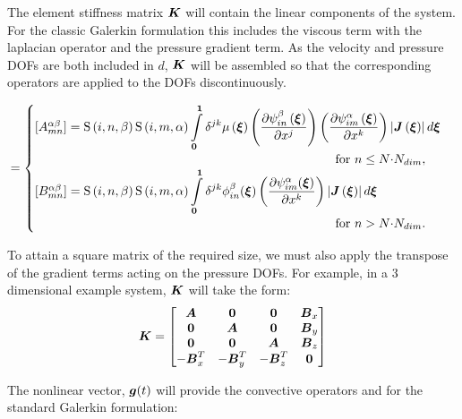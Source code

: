 The element stiffness matrix $\matr{K}$ will contain the linear components of
the system. For the classic Galerkin formulation this includes the viscous
term with the laplacian operator and the pressure gradient term. As the
velocity and pressure DOFs are both included in $d$, $\matr{K}$ will be
assembled so that the corresponding operators are applied to the DOFs
discontinuously.

\begin{equation}
 [K^{\alpha\beta}_{mn}]=
 \begin{cases}
   [A^{\alpha\beta}_{mn}] =  {\idxgsf{i}{n}{\beta}{\idxgsf{i}{m}{\alpha}}}
    \dintl{\vectr{0}}{\vectr{1}}{\delta^{jk}\fnof{\mu}{\vectr{\xi}}}\pbrac{\delby{\idxgbfn{i}{n}{\beta}{\vectr{\xi}}}{x^{j}}}
       \pbrac{\delby{\idxgbfn{i}{m}{\alpha}{\vectr{\xi}}}{x^{k}}}
       \abs{\fnof{\matr{J}}{\vectr{\xi}}}d{\vectr{\xi}}\\
     \qquad\qquad\qquad\qquad\qquad\qquad\qquad\qquad\qquad\qquad\qquad\qquad \text{for $n\le{N{\cdot}{N_{dim}}}$},\\

   [B^{\alpha\beta}_{mn}] = \idxgsf{i}{n}{\beta}\idxgsf{i}{m}{\alpha}
     \dintl{\vectr{0}}{\vectr{1}}\delta^{jk}\phi_{in}^{\beta}({\vectr{\xi}})
     \pbrac{\delby{\psi_{im}^{\alpha}({\vectr{\xi}})}{x^{k}}}\abs{\fnof{\matr{J}}{\vectr{\xi}}}d\vectr{\xi}\\
    \qquad\qquad\qquad\qquad\qquad\qquad\qquad\qquad\qquad\qquad\qquad\qquad \text{for $n>{N{\cdot}{N_{dim}}}$}.
 \end{cases}
\end{equation}

To attain a square matrix of the required size, we must also apply the
transpose of the gradient terms acting on the pressure DOFs. For example, in a
3 dimensional example system, $\matr{K}$ will take the form:
\begin{equation}
  \matr{K}=
   \begin{bmatrix}
     \matr{A} & \matr{0} & \matr{0} & \matr{B}_x\\
     \matr{0} & \matr{A} & \matr{0} & \matr{B}_y\\
     \matr{0} & \matr{0} & \matr{A} & \matr{B}_z\\
     -\matr{B}^T_{x}& -\matr{B}^T_{y} & -\matr{B}^T_z & \matr{0}
   \end{bmatrix}
\end{equation}

The nonlinear vector, $\boldsymbol{g}(t)$ will provide the convective operators and
for the standard Galerkin formulation:

